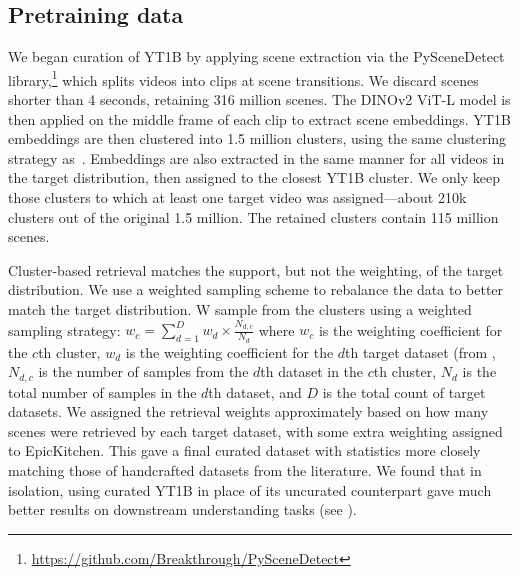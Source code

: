 \documentclass[]{kling/kling}
\begin{document}
\subsection{Pretraining data}
\label{app:pretraining_data_appendix}

We began curation of YT1B by applying scene extraction via the PySceneDetect library,\footnote{\url{https://github.com/Breakthrough/PySceneDetect}} which splits videos into clips at scene transitions.
We discard scenes shorter than 4 seconds, retaining 316 million scenes.
The DINOv2 ViT-L model is then applied on the middle frame of each clip to extract scene embeddings.
YT1B embeddings are then clustered into 1.5 million clusters, using the same clustering strategy as~\citet{oquab2023dinov2}.
Embeddings are also extracted in the same manner for all videos in the target distribution, then assigned to the closest YT1B cluster.
We only keep those clusters to which at least one target video was assigned---about 210k clusters out of the original 1.5 million. The retained clusters contain 115 million scenes.

Cluster-based retrieval matches the support, but not the weighting, of the target distribution.
We use a weighted sampling scheme to rebalance the data to better match the target distribution.
W sample from the clusters using a weighted sampling strategy: $w_c = \sum_{d=1}^{D} w_d \times \frac{N_{d,c}}{N_d}$
where $w_c$ is the weighting coefficient for the $c$th cluster, $w_d$ is the weighting coefficient for the $d$th target dataset (from , $N_{d,c}$ is the number of samples from the $d$th dataset in the $c$th cluster, $N_d$ is the total number of samples in the $d$th dataset, and $D$ is the total count of target datasets.
We assigned the retrieval weights approximately based on how many scenes were retrieved by each target dataset, with some extra weighting assigned to EpicKitchen.
This gave a final curated dataset with statistics more closely matching those of handcrafted datasets from the literature.
We found that in isolation, using curated YT1B in place of its uncurated counterpart gave much better results on downstream  understanding tasks (see ).
\end{document}
